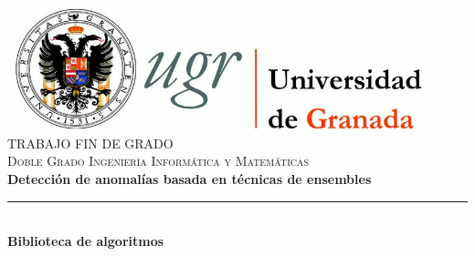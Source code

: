 \begin{titlepage}
 
 
\newlength{\centeroffset}
\setlength{\centeroffset}{-0.5\oddsidemargin}
\addtolength{\centeroffset}{0.5\evensidemargin}
\thispagestyle{empty}

\noindent\hspace*{\centeroffset}\begin{minipage}{\textwidth}

\centering
\includegraphics[width=0.9\textwidth]{imagenes/logos/logo_ugr.jpg}\\[1.4cm]

\textsc{ \Large TRABAJO FIN DE GRADO\\[0.2cm]}
\textsc{ Doble Grado Ingeniería Informática y Matemáticas}\\[1cm]
% 
{\Huge\bfseries Detección de anomalías basada en técnicas de ensembles\\
}
\noindent\rule[-1ex]{\textwidth}{3pt}\\[3.5ex]
{\large\bfseries Biblioteca de algoritmos}
\end{minipage}

\vspace{2.5cm}
\noindent\hspace*{\centeroffset}\begin{minipage}{\textwidth}
\centering


\end{minipage}
\end{titlepage}
